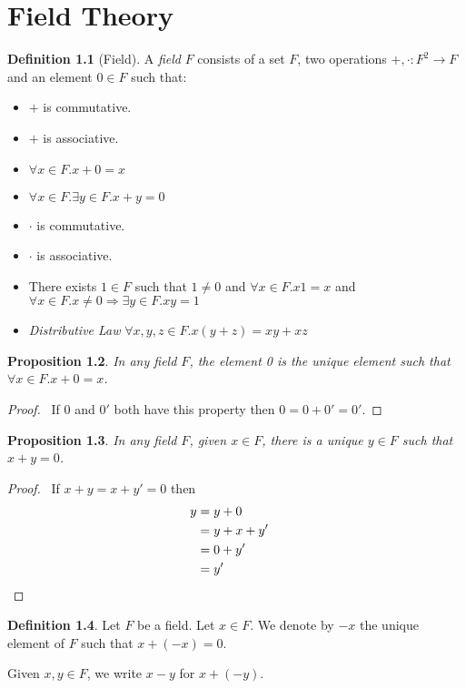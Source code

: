 \documentclass{book}
\let\qed\relax
\newtheorem{prop}{Proposition}[chapter]
\theoremstyle{definition}
\newtheorem{df}[prop]{Definition}
\begin{document}
\chapter{Field Theory}

\begin{df}[Field]
A \emph{field} $F$ consists of a set $F$, two operations $+, \cdot : F^2 \rightarrow F$ and an element $0 \in F$ such that:
\begin{itemize}
\item $+$ is commutative.
\item $+$ is associative.
\item $\forall x \in F. x + 0 = x$
\item $\forall x \in F. \exists y \in F. x + y = 0$
\item $\cdot$ is commutative.
\item $\cdot$ is associative.
\item There exists $1 \in F$ such that $1 \neq 0$ and $\forall x \in F. x1 = x$ and $\forall x \in F. x \neq 0 \Rightarrow \exists y \in F. xy = 1$
\item \emph{Distributive Law} $\forall x,y,z \in F. x(y+z) = xy+xz$
\end{itemize}
\end{df}

\begin{prop}
In any field $F$, the element 0 is the unique element such that $\forall x \in F. x + 0 = x$.
\end{prop}

\begin{proof}
\pf\ If $0$ and $0'$ both have this property then $0 = 0 + 0' = 0'$. \qed
\end{proof}

\begin{prop}
In any field $F$, given $x \in F$, there is a unique $y \in F$ such that $x + y = 0$.
\end{prop}

\begin{proof}
\pf\ If $x + y = x + y' = 0$ then
\begin{align*}
	y & = y + 0 \\
	& = y + x + y' \\
	& = 0 + y' \\
	& = y' & \qed
\end{align*}
\end{proof}

\begin{df}
Let $F$ be a field. Let $x \in F$. We denote by $-x$ the unique element of $F$ such that $x + (-x) = 0$. 

Given $x,y \in F$, we write $x - y$ for $x + (-y)$.
\end{df}
\end{document}
